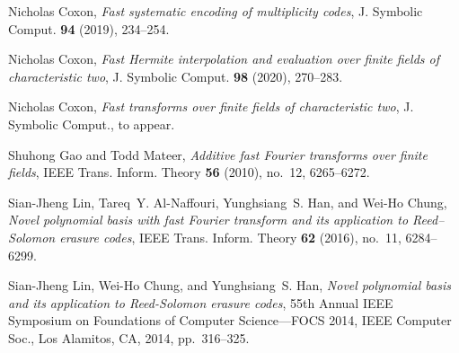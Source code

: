 \documentclass{amsart}
\begin{document}


\begin{thebibliography}{1}
	
	Nicholas Coxon, \emph{Fast systematic encoding of multiplicity codes}, J.
	Symbolic
	Comput. \textbf{94} (2019), 234--254.
	
	Nicholas Coxon, \emph{Fast {H}ermite interpolation and evaluation over finite
		fields of characteristic two}, J. Symbolic
	Comput. \textbf{98} (2020), 270--283.
	
	Nicholas Coxon, \emph{Fast transforms over finite fields of characteristic two},
	J. Symbolic	Comput., to appear.
	
	Shuhong Gao and Todd Mateer, \emph{Additive fast {F}ourier transforms over
		finite fields}, IEEE Trans. Inform. Theory \textbf{56} (2010), no.~12,
	6265--6272.
	
	Sian-Jheng Lin, Tareq~Y. Al-Naffouri, Yunghsiang~S. Han, and Wei-Ho Chung,
	\emph{Novel polynomial basis with fast {F}ourier transform and its
		application to {R}eed--{S}olomon erasure codes}, IEEE Trans. Inform. Theory
	\textbf{62} (2016), no.~11, 6284--6299.
	
	Sian-Jheng Lin, Wei-Ho Chung, and Yunghsiang~S. Han, \emph{Novel polynomial
		basis and its application to {R}eed-{S}olomon erasure codes}, 55th {A}nnual
	{IEEE} {S}ymposium on {F}oundations of {C}omputer {S}cience---{FOCS} 2014,
	IEEE Computer Soc., Los Alamitos, CA, 2014, pp.~316--325.
	
\end{thebibliography}
	
\end{document}
